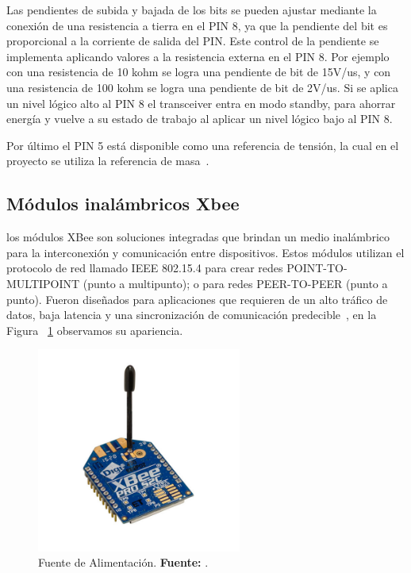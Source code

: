Las pendientes de subida y bajada de los bits se pueden ajustar mediante la conexión de una resistencia a tierra en el PIN 8, ya que la pendiente del bit es proporcional a la corriente de salida del PIN. 
Este control de la pendiente se implementa aplicando valores a la resistencia externa en el PIN 8. 
Por ejemplo con una resistencia de 10 kohm se logra una pendiente de bit de 15V/us,  y con una resistencia de 100 kohm se logra una pendiente de bit de 2V/us. 
Si se aplica un nivel lógico alto al PIN 8 el transceiver entra en modo standby, para ahorrar energía y vuelve a su estado de trabajo al aplicar un nivel lógico bajo al PIN 8. 

Por último el PIN 5 está disponible como una referencia de tensión, la cual en el proyecto se utiliza la referencia de masa~\cite{sn}.  %

\subsection{Módulos inalámbricos Xbee}
 los módulos XBee son soluciones integradas que brindan un medio inalámbrico para la interconexión y comunicación entre dispositivos. Estos módulos utilizan el protocolo de red llamado IEEE 802.15.4 para crear redes POINT-TO-MULTIPOINT (punto a multipunto); o para redes PEER-TO-PEER (punto a punto). Fueron diseñados para aplicaciones que requieren de un alto tráfico de datos, baja latencia y una sincronización de comunicación predecible~\cite{xbee_c4}, en la Figura ~\ref{fig_xbee_4} observamos su apariencia. 
 
\begin{figure}[H]
	\centering
		\includegraphics[width=0.6\textwidth]{./Cap4imagen/xbee_modulo.jpg}
	\caption[Fuente de Alimentación.]{Fuente de Alimentación.\textbf{ Fuente:}  \cite{cite_xbee_4}.}
	\label{fig_xbee_4} %
\end{figure}


